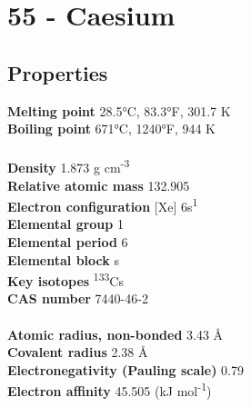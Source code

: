 \section{55 - Caesium}
\label{sec:elem-caesium}
\subsection{Properties}
\textbf{Melting point} 28.5°C, 83.3°F, 301.7 K\\
\textbf{Boiling point} 671°C, 1240°F, 944 K\\
\\
\textbf{Density} 1.873 g cm\textsuperscript{-3}\\
\textbf{Relative atomic mass} 132.905\\
\textbf{Electron configuration} [Xe] 6s\textsuperscript{1}\\
\textbf{Elemental group} 1\\
\textbf{Elemental period} 6\\
\textbf{Elemental block} s\\
\textbf{Key isotopes} \textsuperscript{133}Cs\\
\textbf{CAS number} 7440-46-2\\
\\
\textbf{Atomic radius, non-bonded} 3.43 Å\\
\textbf{Covalent radius} 2.38 Å\\
\textbf{Electronegativity (Pauling scale)} 0.79\\
\textbf{Electron affinity} 45.505 (kJ mol\textsuperscript{-1})\\